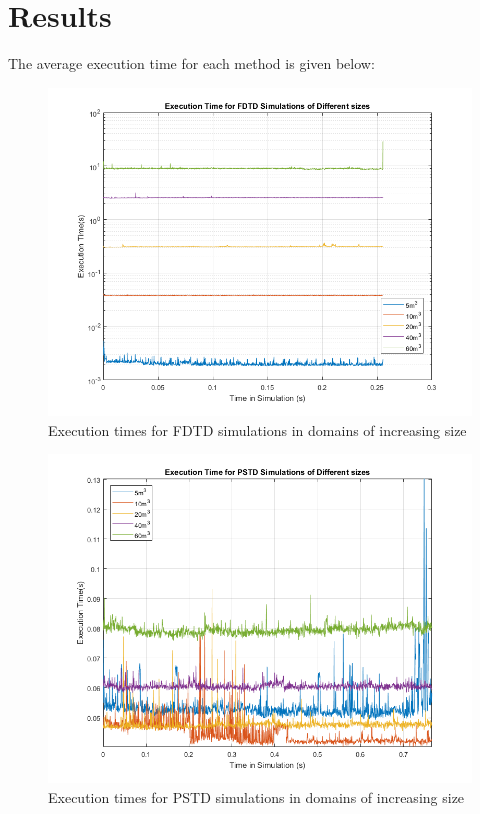 \section{Results}
The average execution time for each method is given below: \\
\begin{figure}[H]
\centering
  \includegraphics[width=\textwidth]{./graphics/FDTD simulation execution time.png}
  \caption{Execution times for FDTD simulations in domains of increasing size}
\end{figure}

\begin{figure}[H]
\centering
  \includegraphics[width=\textwidth]{./graphics/PSTD Simulation Execution Times.png}
  \caption{Execution times for PSTD simulations in domains of increasing size}
\end{figure}

